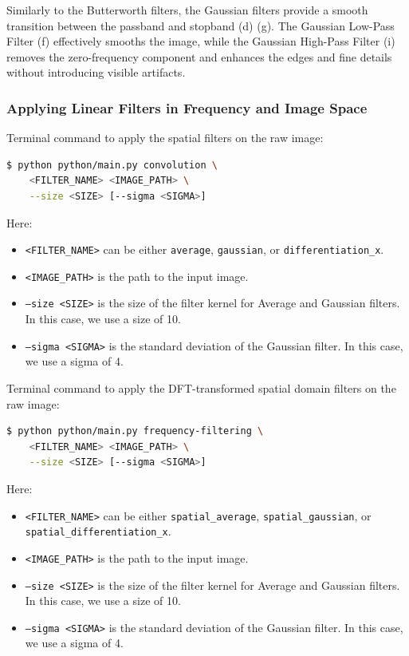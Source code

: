 \documentclass[a4paper,12pt]{article}
\begin{document}
Similarly to the Butterworth filters, the Gaussian filters provide a smooth transition between the passband and stopband (d) (g). The Gaussian Low-Pass Filter (f) effectively smooths the image, while the Gaussian High-Pass Filter (i) removes the zero-frequency component and enhances the edges and fine details without introducing visible artifacts.

\subsubsection{Applying Linear Filters in Frequency and Image Space}

Terminal command to apply the spatial filters on the raw image:

\begin{lstlisting}[language=bash]
$ python python/main.py convolution \
    <FILTER_NAME> <IMAGE_PATH> \
    --size <SIZE> [--sigma <SIGMA>]
\end{lstlisting}

Here:

\begin{itemize}
    \item \texttt{<FILTER\_NAME>} can be either \texttt{average}, \texttt{gaussian}, or \texttt{differentiation\_x}.
    \item \texttt{<IMAGE\_PATH>} is the path to the input image.
    \item \texttt{--size <SIZE>} is the size of the filter kernel for Average and Gaussian filters. In this case, we use a size of 10.
    \item \texttt{--sigma <SIGMA>} is the standard deviation of the Gaussian filter. In this case, we use a sigma of 4.
\end{itemize}

Terminal command to apply the DFT-transformed spatial domain filters on the raw image:

\begin{lstlisting}[language=bash]
$ python python/main.py frequency-filtering \
    <FILTER_NAME> <IMAGE_PATH> \
    --size <SIZE> [--sigma <SIGMA>]
\end{lstlisting}

Here:

\begin{itemize}
    \item \texttt{<FILTER\_NAME>} can be either \texttt{spatial\_average}, \texttt{spatial\_gaussian}, or \texttt{spatial\_differentiation\_x}.
    \item \texttt{<IMAGE\_PATH>} is the path to the input image.
    \item \texttt{--size <SIZE>} is the size of the filter kernel for Average and Gaussian filters. In this case, we use a size of 10.
    \item \texttt{--sigma <SIGMA>} is the standard deviation of the Gaussian filter. In this case, we use a sigma of 4.
\end{itemize}
\end{document}
